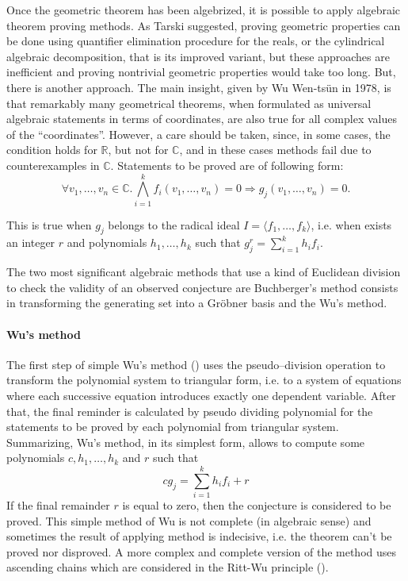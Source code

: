 \documentclass[final,1p,times,authoryear]{elsarticle}
\begin{document}
Once the geometric theorem has been algebrized, it is possible to
apply algebraic theorem proving methods.  As Tarski suggested, proving
geometric properties can be done using quantifier elimination
procedure for the reals, or the cylindrical algebraic decomposition,
that is its improved variant, but these approaches are inefficient and
proving nontrivial geometric properties would take too long. But,
there is another approach. The main insight, given by Wu Wen-ts\"un in
1978, is that remarkably many geometrical theorems, when formulated as
universal algebraic statements in terms of coordinates, are also true
for all complex values of the ``coordinates''. However, a care should
be taken, since, in some cases, the condition holds for $\mathbb{R}$,
but not for $\mathbb{C}$, and in these cases methods fail due to
counterexamples in $\mathbb{C}$. Statements to be proved are of
following form:
$$\forall v_1, \ldots, v_n \in \mathbb{C}. \bigwedge_{i = 1}^{k} f_i(v_1, \ldots, v_n) = 0 \Longrightarrow g_j(v_1, \ldots, v_n) = 0.$$

This is true when $g_j$ belongs to the radical ideal $I = \langle f_1,
\ldots, f_k \rangle$, i.e. when exists an integer $r$ and polynomials
$h_1, \ldots, h_k$ such that $g_j^r = \sum_{i=1}^k h_if_i$.

The two most significant algebraic methods that use a kind of
Euclidean division to check the validity of an observed conjecture are
Buchberger's method consists in transforming the generating set into a
Gr\"obner basis and the Wu's method.

\paragraph{Wu's method}

The first step of simple Wu's method (\cite{wu}) uses the
pseudo--division operation to transform the polynomial system to
triangular form, i.e. to a system of equations where each successive
equation introduces exactly one dependent variable. After that, the
final reminder is calculated by pseudo dividing polynomial for the
statements to be proved by each polynomial from triangular system.
Summarizing, Wu's method, in its simplest form, allows to compute some
polynomials $c, h_1, \ldots, h_k$ and $r$ such that
$$cg_j = \sum_{i=1}^{k}h_if_i + r$$ If the final remainder $r$ is
equal to zero, then the conjecture is considered to be proved. This
simple method of Wu is not complete (in algebraic sense) and
sometimes the result of applying method is indecisive, i.e. the
theorem can't be proved nor disproved. A more complex and complete
version of the method uses ascending chains which are considered in
the Ritt-Wu principle (\cite{ritt}).
\end{document}
